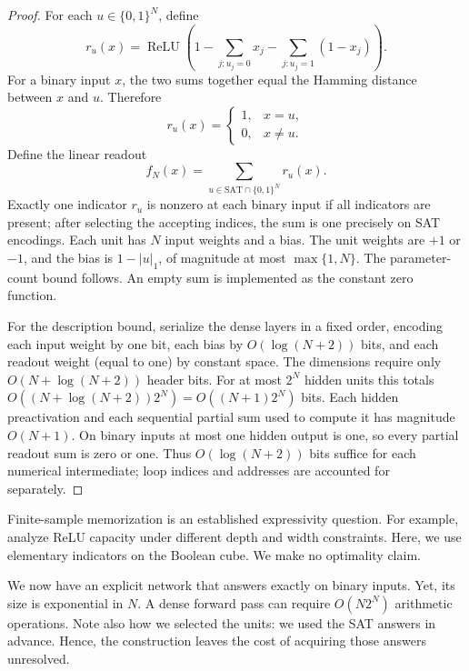 \documentclass[11pt,a4paper]{article}
\numberwithin{equation}{section}
\newcommand{\SAT}{\mathrm{SAT}}
\newcommand{\bits}{\{0,1\}}
\newcommand{\ReLU}{\operatorname{ReLU}}
\theoremstyle{plain}
\theoremstyle{definition}
\theoremstyle{remark}
\begin{document}
\begin{proof}
For each $u\in\bits^N$, define
\begin{equation}
r_u(x)=\ReLU\!\left(
1-\sum_{j:u_j=0}x_j-\sum_{j:u_j=1}(1-x_j)
\right).
\label{eq:relu-unit}
\end{equation}
For a binary input $x$, the two sums together equal the Hamming distance between $x$ and $u$. Therefore
\begin{equation}
r_u(x)=\begin{cases}1,&x=u,\\0,&x\neq u.\end{cases}
\end{equation}
Define the linear readout
\begin{equation}
f_N(x)=\sum_{u\in\SAT\cap\bits^N}r_u(x).
\label{eq:relu-sat}
\end{equation}
Exactly one indicator $r_u$ is nonzero at each binary input if all indicators are present; after selecting the accepting indices, the sum is one precisely on SAT encodings. Each unit has $N$ input weights and a bias. The unit weights are $+1$ or $-1$, and the bias is $1-|u|_1$, of magnitude at most $\max\{1,N\}$. The parameter-count bound follows. An empty sum is implemented as the constant zero function.

For the description bound, serialize the dense layers in a fixed order, encoding each input weight by one bit, each bias by $O(\log(N+2))$ bits, and each readout weight (equal to one) by constant space. The dimensions require only $O(N+\log(N+2))$ header bits. For at most $2^N$ hidden units this totals $O((N+\log(N+2))2^N)=O((N+1)2^N)$ bits. Each hidden preactivation and each sequential partial sum used to compute it has magnitude $O(N+1)$. On binary inputs at most one hidden output is one, so every partial readout sum is zero or one. Thus $O(\log(N+2))$ bits suffice for each numerical intermediate; loop indices and addresses are accounted for separately.
\end{proof}

Finite-sample memorization is an established expressivity question. For example, \citet{yun2019} analyze ReLU capacity under different depth and width constraints. Here, we use elementary indicators on the Boolean cube. We make no optimality claim.

We now have an explicit network that answers exactly on binary inputs. Yet, its size is exponential in $N$. A dense forward pass can require $O(N2^N)$ arithmetic operations. Note also how we selected the units: we used the SAT answers in advance. Hence, the construction leaves the cost of acquiring those answers unresolved.
\end{document}
